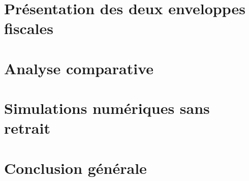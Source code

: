 \documentclass[a4paper, 11pt]{article}
\begin{document}
\pagestyle{fancy} %




\section{Présentation des deux enveloppes fiscales}
\label{sec:presentation}



\section{Analyse comparative}
\label{sec:analyse}




\section{Simulations numériques sans retrait}
\label{sec:simulations_sans_retrait}






% 


\section{Conclusion générale}




\end{document}
